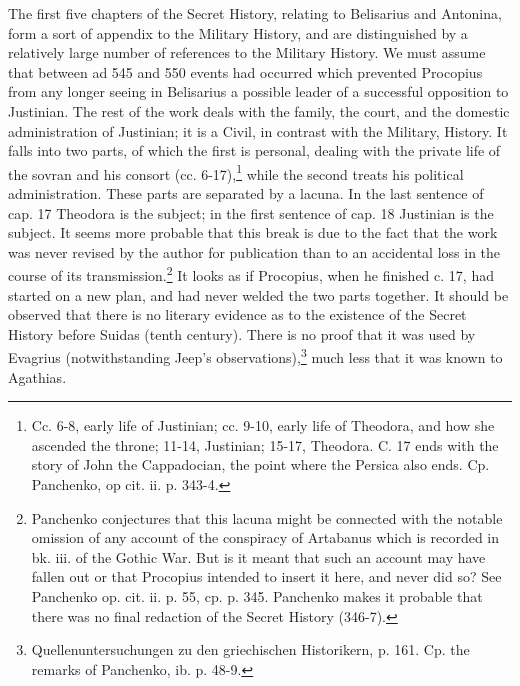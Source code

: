 The first five chapters of the Secret History, relating to Belisarius and Antonina, form a sort of appendix to the Military History, and are distinguished by a relatively large number of references to the Military History. We must assume that between ad 545 and 550 events had occurred which prevented Procopius from any longer seeing in Belisarius a possible leader of a successful opposition to Justinian. The rest of the work deals with the family, the court, and the domestic administration of Justinian; it is a Civil, in contrast with the Military, History. It falls into two parts, of which the first is personal, dealing with the private life of the sovran and his consort (cc. 6-17),\footnote{Cc. 6-8, early life of Justinian; cc. 9-10, early life of Theodora, and how she ascended the throne; 11-14, Justinian; 15-17, Theodora. C. 17 ends with the story of John the Cappadocian, the point where the Persica also ends. Cp. Panchenko, op cit. ii. p. 343-4.} while the second treats his political administration. These parts are separated by a lacuna. In the last sentence of cap. 17 Theodora is the subject; in the first sentence of cap. 18 Justinian is the subject. It seems more probable that this break is due to the fact that the work was never revised by the author for publication than to an accidental loss in the course of its transmission.\footnote{Panchenko conjectures that this lacuna might be connected with the notable omission of any account of the conspiracy of Artabanus which is recorded in bk. iii. of the Gothic War. But is it meant that such an account may have fallen out or that Procopius intended to insert it here, and never did so? See Panchenko op. cit. ii. p. 55, cp. p. 345. Panchenko makes it probable that there was no final redaction of the Secret History (346-7).} It looks as if Procopius, when he finished c. 17, had started on a new plan, and had never welded the two parts together. It should be observed that there is no literary evidence as to the existence of the Secret History before Suidas (tenth century). There is no proof that it was used by Evagrius (notwithstanding Jeep\texthebrew{}’s observations),\footnote{Quellenuntersuchungen zu den griechischen Historikern, p. 161. Cp. the remarks of Panchenko, ib. p. 48-9.} much less that it was known to Agathias.

